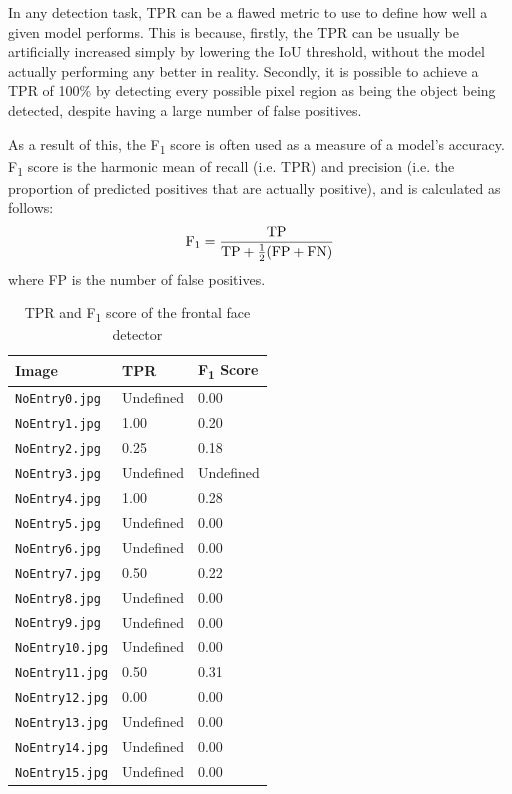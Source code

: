 \documentclass[twocolumn, 10pt, a4paper]{article}
\begin{document}
In any detection task, TPR can be a flawed metric to use to define how well a given model performs.
This is because, firstly, the TPR can be usually be artificially increased simply by lowering the IoU threshold, without the model actually performing any better in reality.
Secondly, it is possible to achieve a TPR of 100\% by detecting every possible pixel region as being the object being detected, despite having a large number of false positives.

As a result of this, the F\textsubscript{1} score is often used as a measure of a model's accuracy.
F\textsubscript{1} score is the harmonic mean of recall (i.e. TPR) and precision (i.e. the proportion of predicted positives that are actually positive), and is calculated as follows:
\[
  \textrm{F\textsubscript{1}} = \frac{\textrm{TP}}{\textrm{TP} + \frac{1}{2}(\textrm{FP} + \textrm{FN})}
\]
where FP is the number of false positives. 

\begin{table}[htbp]
  \begin{center}
  \caption{TPR and F\textsubscript{1} score of the frontal face detector}\label{tab:face}
  \begin{tabular}{l | l l} 
    \hline\hline
    Image&TPR&F\textsubscript{1} Score\\
    \hline
    \texttt{NoEntry0.jpg}&Undefined&0.00\\ 
    \texttt{NoEntry1.jpg}&1.00&0.20\\ 
    \texttt{NoEntry2.jpg}&0.25&0.18\\ 
    \texttt{NoEntry3.jpg}&Undefined&Undefined\\ 
    \texttt{NoEntry4.jpg}&1.00&0.28\\ 
    \texttt{NoEntry5.jpg}&Undefined&0.00\\ 
    \texttt{NoEntry6.jpg}&Undefined&0.00\\ 
    \texttt{NoEntry7.jpg}&0.50&0.22\\ 
    \texttt{NoEntry8.jpg}&Undefined&0.00\\ 
    \texttt{NoEntry9.jpg}&Undefined&0.00\\ 
    \texttt{NoEntry10.jpg}&Undefined&0.00\\ 
    \texttt{NoEntry11.jpg}&0.50&0.31\\ 
    \texttt{NoEntry12.jpg}&0.00&0.00\\ 
    \texttt{NoEntry13.jpg}&Undefined&0.00\\ 
    \texttt{NoEntry14.jpg}&Undefined&0.00\\ 
    \texttt{NoEntry15.jpg}&Undefined&0.00\\ 
    \hline
  \end{tabular}
  \end{center}
\end{table} 
\end{document}
